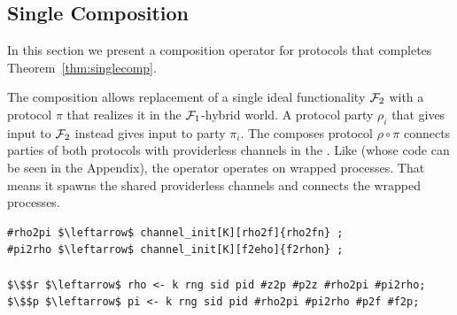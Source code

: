 \subsection{Single Composition}
In this section we present a composition operator for protocols that completes Theorem~\ref{thm:singlecomp}.

The composition allows replacement of a single ideal functionality $\mathcal{F}_2$ with a protocol $\pi$ that realizes it in the $\mathcal{F}_1$-hybrid world. 
A protocol party $\rho_i$ that gives input to $\mathcal{F}_2$ instead gives input to party $\pi_i$. 
The composes protocol $\rho \circ \pi$ connects parties of both protocols with providerless channels in the \partywrapper. 
Like  (whose code can be seen in the Appendix), the operator operates on wrapped processes. That means it spawns the shared providerless channels and connects the wrapped processes.
\begin{lstlisting}[basicstyle=\footnotesize\BeraMonottFamily, mathescape, frame=single]
#rho2pi $\leftarrow$ channel_init[K][rho2f]{rho2fn} ;
#pi2rho $\leftarrow$ channel_init[K][f2eho]{f2rhon} ;

$\$$r $\leftarrow$ rho <- k rng sid pid #z2p #p2z #rho2pi #pi2rho; 
$\$$p $\leftarrow$ pi <- k rng sid pid #rho2pi #pi2rho #p2f #f2p;
\end{lstlisting}



